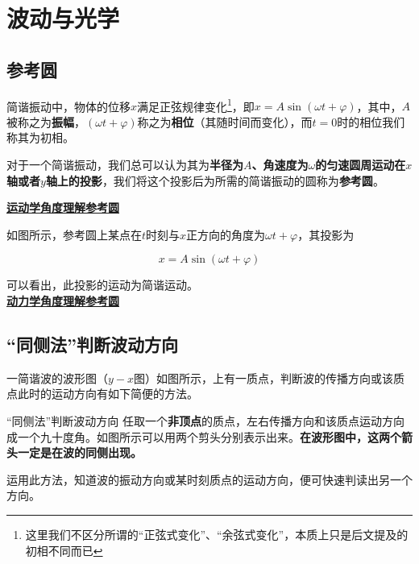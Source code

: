 
\chapter{波动与光学}

\section{参考圆}

简谐振动中，物体的位移$x$满足正弦规律变化\footnote{这里我们不区分所谓的“正弦式变化”、“余弦式变化”，本质上只是后文提及的初相不同而已}，即$x = A \sin (\omega t + \varphi)$，其中，$A$被称之为\textbf{振幅}，$(\omega t + \varphi)$称之为\textbf{相位}（其随时间而变化），而$t=0$时的相位我们称其为$初相$。

对于一个简谐振动，我们总可以认为其为\textbf{半径为$A$、角速度为$\omega$的匀速圆周运动在$x$轴或者$y$轴上的投影}，我们将这个投影后为所需的简谐振动的圆称为\textbf{参考圆}。

\noindent \uline{\textbf{运动学角度理解参考圆}}

如图所示，参考圆上某点在$t$时刻与$x$正方向的角度为$\omega t + \varphi$，其投影为

$$x = A \sin (\omega t + \varphi)$$

可以看出，此投影的运动为简谐运动。
~\\

\noindent \uline{\textbf{动力学角度理解参考圆}}


\section{“同侧法”判断波动方向}



一简谐波的波形图（$y - x$图）如图所示，上有一质点，判断波的传播方向或该质点此时的运动方向有如下简便的方法。

\begin{theo}{“同侧法”判断波动方向}{}
任取一个\textbf{非顶点}的质点，左右传播方向和该质点运动方向成一个九十度角。如图所示可以用两个剪头分别表示出来。\textbf{在波形图中，这两个箭头一定是在波的同侧出现。}

运用此方法，知道波的振动方向或某时刻质点的运动方向，便可快速判读出另一个方向。

\end{theo}

